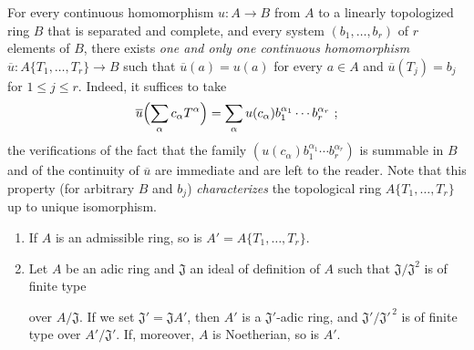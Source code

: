 \begin{env}[7.5.3]
\label{0.7.5.3}
For every continuous homomorphism $u:A\to B$ from $A$ to a linearly
topologized ring $B$ that is separated and complete, and every system $(b_1,\ldots,b_r)$ of $r$
elements of $B$, there exists \emph{one and only one continuous homomorphism}
$\overline u:A\{T_1,\ldots,T_r\}\to B$ such that $\overline u(a)=u(a)$ for
every $a\in A$ and $\overline u(T_j)=b_j$ for $1\leq j\leq r$. Indeed, it suffices
to take
\[
  \overline u\Bigl(\sum_\alpha c_\alpha T^\alpha\Bigr)
  =\sum_\alpha u(c_\alpha)b_1^{\alpha_1}\cdots b_r^{\alpha_r}~;
\]
the verifications of the fact that the family
$(u(c_\alpha)b_1^{\alpha_1}\cdots b_r^{\alpha_r})$ is summable in $B$ and
of the continuity of $\overline u$ are immediate and are left to the reader. Note
that this property (for arbitrary $B$ and $b_j$)
\emph{characterizes} the topological ring $A\{T_1,\ldots,T_r\}$ up to
unique isomorphism.
\end{env}

\begin{proposition}[7.5.4]
\label{0.7.5.4}
\begin{enumerate}
  \item[(i)] If $A$ is an admissible ring, so is
  $A'=A\{T_1,\ldots,T_r\}$.
  \item[(ii)] Let $A$ be an adic ring and $\mathfrak J$ an ideal of definition
  of $A$ such that $\mathfrak J/\mathfrak J^2$ is of finite type


  over $A/\mathfrak J$. If we set $\mathfrak J'=\mathfrak JA'$, then $A'$ is
  a $\mathfrak J'$-adic ring, and
  $\mathfrak J'/\mathfrak J'^{\,2}$ is of finite type over
  $A'/\mathfrak J'$. If, moreover, $A$ is Noetherian, so is
  $A'$.
\end{enumerate}
\end{proposition}

